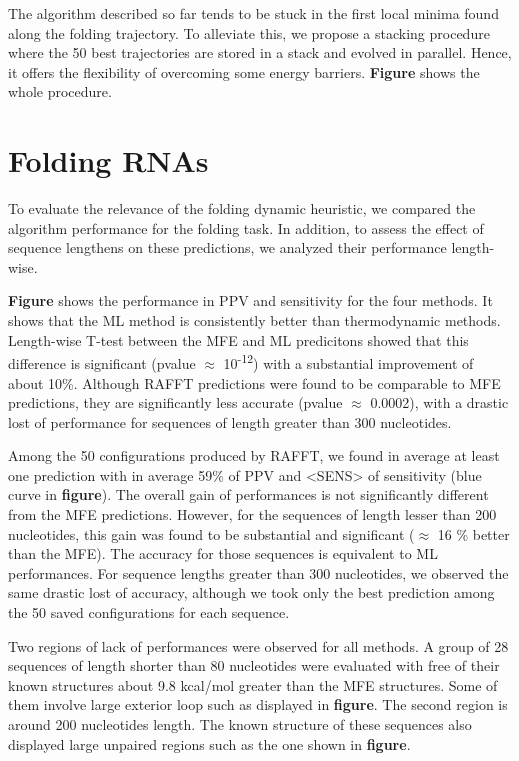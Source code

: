 \documentclass[a4paper,12pt]{article}
\begin{document}
{{The algorithm described so far tends to be stuck in the first local minima found
along the folding trajectory. To alleviate this, we propose a stacking procedure
where the 50 best trajectories are stored in a stack and evolved in parallel.
Hence, it offers the flexibility of overcoming some energy barriers. \textbf{Figure}
shows the whole procedure.

\section{Folding RNAs}
\label{sec:orgfdd6a76}
To evaluate the relevance of the folding dynamic heuristic, we compared the
algorithm performance for the folding task. In addition, to assess the effect of
sequence lengthens on these predictions, we analyzed their performance
length-wise.

\textbf{Figure} shows the performance in PPV and sensitivity for the four methods. It
shows that the ML method is consistently better than thermodynamic methods.
Length-wise T-test between the MFE and ML predicitons showed that this
difference is significant (pvalue \(\approx\) 10\textsuperscript{-12}) with a substantial
improvement of about 10\%. Although RAFFT predictions were found to be comparable
to MFE predictions, they are significantly less accurate (pvalue \(\approx\)
0.0002), with a drastic lost of performance for sequences of length greater than
300 nucleotides.

Among the 50 configurations produced by RAFFT, we found in average at least one
prediction with in average 59\% of PPV and <SENS> of sensitivity (blue curve in
\textbf{figure}). The overall gain of performances is not significantly different from
the MFE predictions. However, for the sequences of length lesser than 200
nucleotides, this gain was found to be substantial and significant (\(\approx\) 16 \%
better than the MFE). The accuracy for those sequences is equivalent to ML
performances. For sequence lengths greater than 300 nucleotides, we observed the
same drastic lost of accuracy, although we took only the best prediction among
the 50 saved configurations for each sequence.

Two regions of lack of performances were observed for all methods. A group of 28
sequences of length shorter than 80 nucleotides were evaluated with free of
their known structures about 9.8 kcal/mol greater than the MFE structures. Some
of them involve large exterior loop such as displayed in \textbf{figure}. The second
region is around 200 nucleotides length. The known structure of these sequences
also displayed large unpaired regions such as the one shown in \textbf{figure}.

}}
\end{document}
